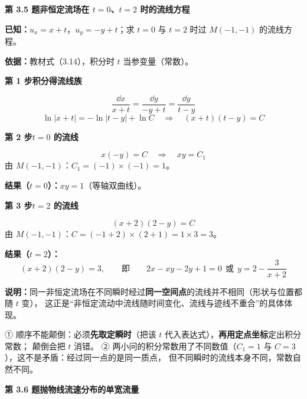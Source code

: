 \noindent\textbf{第 3.5 题\quad 非恒定流场在 $t=0$、$t=2$ 时的流线方程}

\begin{jie}
\textbf{已知：}$u_x=x+t$，$u_y=-y+t$；求 $t=0$ 与 $t=2$ 时过 $M(-1,-1)$ 的流线方程。

\textbf{依据：}教材式（3.14），积分时 $t$ 当参变量（常数）。

\textbf{第 1 步\quad 积分得流线族}

\[ \frac{\dd x}{x+t}=\frac{\dd y}{-y+t}=\frac{\dd y}{t-y} \]
\[ \ln|x+t|=-\ln|t-y|+\ln C \quad\Longrightarrow\quad \boxed{(x+t)(t-y)=C} \]

\textbf{第 2 步\quad $t=0$ 的流线}

\[ x(-y)=C \quad\Longrightarrow\quad xy=C_1 \]
由 $M(-1,-1)$：$C_1=(-1)\times(-1)=1$。

\textbf{结果（$t=0$）：}$xy=1$（等轴双曲线）。

\textbf{第 3 步\quad $t=2$ 的流线}

\[ (x+2)(2-y)=C \]
由 $M(-1,-1)$：$C=(-1+2)\times(2+1)=1\times3=3$。

\textbf{结果（$t=2$）：}
\[ (x+2)(2-y)=3,\qquad\text{即}\qquad 2x-xy-2y+1=0\ \ \text{或}\ \ y=2-\frac{3}{x+2} \]

\textbf{说明：}同一非恒定流场在不同瞬时经过\textbf{同一空间点}的流线并不相同（形状与位置都随 $t$ 变），
这正是“非恒定流动中流线随时间变化、流线与迹线不重合”的具体体现。
\end{jie}

\begin{yicuo}
① 顺序不能颠倒：必须\textbf{先取定瞬时}（把该 $t$ 代入表达式），\textbf{再用定点坐标}定出积分常数；
颠倒会把 $t$ 消错。
② 两小问的积分常数用了不同数值（$C_1=1$ 与 $C=3$），这不是矛盾：经过同一点的是同一质点，
但不同瞬时的流线本身不同，常数自然不同。
\end{yicuo}

\noindent\textbf{第 3.6 题\quad 抛物线流速分布的单宽流量}

